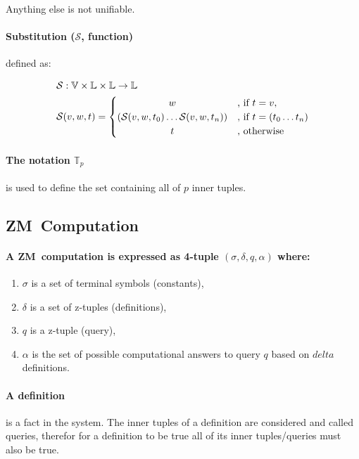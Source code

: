 \documentclass[11pt,a4paper]{report}
\newcommand{\zm}{ZM}
\begin{document}
Anything else is not unifiable.

\paragraph{Substitution ($\mathcal{S}$, function)} defined as:

\begin{align}
    \mathcal{S}&: \mathbb{V} \times \mathbb{L} \times \mathbb{L} \rightarrow \mathbb{L}\\
    \mathcal{S}&(v, w, t) =
    \begin{cases}
        \hfill w \hfill &\text{, if } t = v,\\
        \hfill (\mathcal{S}(v, w, t_{0}) \ldots \mathcal{S}(v, w, t_{n})) \hfill & \text{, if } t = (t_{0} \ldots t_{n})\\
        \hfill t \hfill & \text{, otherwise}
    \end{cases}
\end{align}


\paragraph{The notation $\mathbb{T}_{p}$} is used to define the set containing all of $p$ inner tuples.

\subsection{\zm\ Computation}
\paragraph{A \zm\ computation is expressed as 4-tuple $(\sigma, \delta, q, \alpha)$ where:}

\begin{enumerate}
\item $\sigma$ is a set of terminal symbols (constants),
\item $\delta$ is a set of z-tuples (definitions),
\item $q$ is a z-tuple (query),
\item $\alpha$ is the set of possible computational answers to query $q$ based on $delta$ definitions.
\end{enumerate}

\paragraph{A definition} is a fact in the system. The inner tuples of a definition are considered and called queries, therefor
for a definition to be true all of its inner tuples/queries must also be true.
\end{document}
